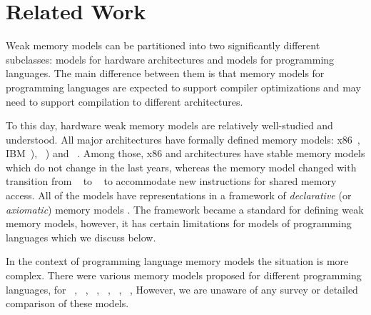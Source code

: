\section{Related Work}
\label{sec:related}
Weak memory models can be partitioned into two significantly different subclasses:
models for hardware architectures and models for programming languages.
The main difference between them is that memory models for programming languages
are expected to support compiler optimizations and may need to support compilation
to different architectures.

To this day, hardware weak memory models are relatively well-studied and understood.
All major architectures have formally defined memory models:
x86~\cite{Sewell-al:CACM10},
IBM~\POWER \cite{Alglave-DAMP09,Sarkar-al:PLDI11,Alglave-al:TOPLAS14}),
\ARM~\cite{Chong-ASPLOS08, Alglave-DAMP09,Pulte-al:POPL18,Flur-al:POPL16,Alglave-al:TOPLAS14})
and \RISC~\cite{Pulte-al:POPL18}.
Among those, x86 and \POWER architectures have stable memory models which do not change in the last years,
whereas the \ARM memory model changed with transition from ~\cite{Alglave-al:TOPLAS14} to ~\cite{Pulte-al:POPL18}
to accommodate new instructions for shared memory access.
All of the models have representations in a framework of \emph{declarative} (or \emph{axiomatic}) memory models \cite{Alglave-al:TOPLAS14}.
The framework became a standard for defining weak memory models, %
however, it has certain limitations for models of programming languages which we discuss below.



In the context of programming language memory models the situation is more complex. 
There were various memory models proposed for different programming languages, \eg
for \Java~\cite{Manson-al:POPL05, Bender-Palsberg:OOPSLA19}, \CPP~\cite{Batty-al:POPL11}, 
\LLVM~\cite{Chakraborty-Vafeiadis:CGO17}, \JS~\cite{Watt-al:PLDI2020}, 
\OCaml~\cite{Manson-al:POPL05}, \Haskell~\cite{Vollmer-al:PPoPP17}, \etc 
However, we are unaware of any survey or detailed comparison of these models.

